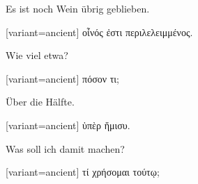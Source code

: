 Es ist noch Wein übrig geblieben.

\switchcolumn

\begin{greek}[variant=ancient]%
οἶνός ἐστι περιλελειμμένος.

\end{greek}%
\switchcolumn*

Wie viel etwa?

\switchcolumn

\begin{greek}[variant=ancient]%
πόσον τι;

\end{greek}%
\switchcolumn*

Über die Hälfte.

\switchcolumn

\begin{greek}[variant=ancient]%
ὑπὲρ ἥμισυ.

\end{greek}%
\switchcolumn*

Was soll ich damit machen?

\switchcolumn

\begin{greek}[variant=ancient]%
τί χρήσομαι τούτῳ;

\end{greek}%
